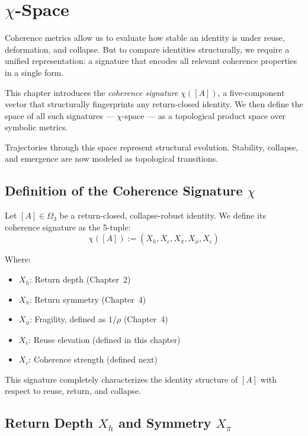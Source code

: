 \chapter{$\chi$-Space}

Coherence metrics allow us to evaluate how stable an identity is under reuse, deformation, and collapse.  
But to compare identities structurally, we require a unified representation:  
a signature that encodes all relevant coherence properties in a single form.

This chapter introduces the \textit{coherence signature} $\chi([A])$,  
a five-component vector that structurally fingerprints any return-closed identity.  
We then define the space of all such signatures — $\chi$-space — as a topological product space over symbolic metrics.

Trajectories through this space represent structural evolution.  
Stability, collapse, and emergence are now modeled as topological transitions.

\section{Definition of the Coherence Signature $\chi$}

\begin{definition} \label{def:chi-signature}
Let $[A] \in \Omega_3$ be a return-closed, collapse-robust identity.  
We define its coherence signature as the 5-tuple:
\begin{equation} \label{eq:chi-signature}
\chi([A]) := (X_h, X_c, X_\pi, X_\phi, X_\epsilon)
\end{equation}

Where:
\begin{itemize}
  \item $X_h$: Return depth (Chapter~2)
  \item $X_\pi$: Return symmetry (Chapter~4)
  \item $X_\phi$: Fragility, defined as $1 / \rho$ (Chapter~4)
  \item $X_\epsilon$: Reuse elevation (defined in this chapter)
  \item $X_c$: Coherence strength (defined next)
\end{itemize}
\end{definition}

This signature completely characterizes the identity structure of $[A]$ with respect to reuse, return, and collapse.

\section{Return Depth $X_h$ and Symmetry $X_\pi$}

